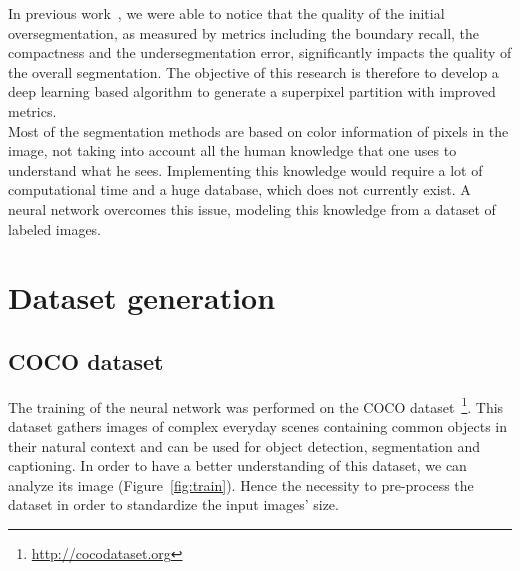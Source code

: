 \documentclass{article}
\begin{document}
            In previous work~\cite{chang_2019}, we were able to notice that the quality of the initial oversegmentation, as measured by metrics including the boundary recall, the compactness and the undersegmentation error, significantly impacts the quality of the overall segmentation. The objective of this research is therefore to develop a deep learning based algorithm to generate a superpixel partition with improved metrics.\\
            Most of the segmentation methods are based on color information of pixels in the image, not taking into account all the human knowledge that one uses to understand what he sees. Implementing this knowledge would require a lot of computational time and a huge database, which does not currently exist. A neural network overcomes this issue, modeling this knowledge from a dataset of labeled images.


\newpage
\section{Dataset generation}
    \subsection{COCO dataset}

        The training of the neural network was performed on the COCO dataset~\cite{microsoft2014}\footnote{\url{http://cocodataset.org}}. This dataset gathers images of complex everyday scenes containing common objects in their natural context and can be used for object detection, segmentation and captioning. In order to have a better understanding of this dataset, we can analyze its image (Figure~\ref{fig:train}). Hence the necessity to pre-process the dataset in order to standardize the input images' size.
\end{document}
